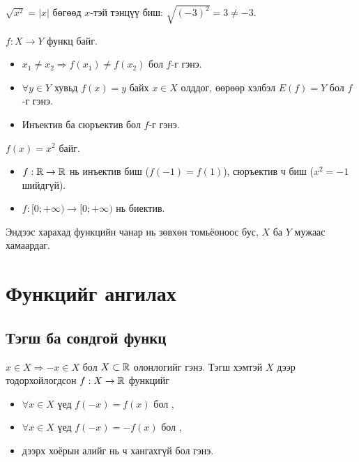 \begin{remark}
$\sqrt{x^2}=|x|$ бөгөөд $x$-тэй тэнцүү биш: $\sqrt{(-3)^2}=3\neq-3$.
\end{remark}

\begin{definition}
$f:X\to Y$ функц байг.
\begin{itemize}
  \item $x_1\neq x_2 \Rightarrow f(x_1)\neq f(x_2)$ бол $f$-г  гэнэ.
  \item $\forall y\in Y$ хувьд $f(x)=y$ байх $x\in X$ олддог, өөрөөр хэлбэл $E(f)=Y$ бол
        $f$-г  гэнэ.
  \item Инъектив ба сюръектив бол $f$-г  гэнэ.
\end{itemize}
\end{definition}

\begin{example}
$f(x)=x^2$ байг.
\begin{itemize}
  \item $f:\mathbb{R}\to\mathbb{R}$ нь инъектив биш ($f(-1)=f(1)$), сюръектив ч биш ($x^2=-1$ шийдгүй).
  \item $f:[0;+\infty)\to[0;+\infty)$ нь биектив.
\end{itemize}
Эндээс харахад функцийн чанар нь зөвхөн томьёоноос бус, $X$ ба $Y$ мужаас хамаардаг.
\end{example}

\section{Функцийг ангилах}

\subsection{Тэгш ба сондгой функц}
\begin{definition}
$x\in X \Rightarrow -x\in X$ бол $X\subset\mathbb{R}$ олонлогийг  гэнэ.
Тэгш хэмтэй $X$ дээр тодорхойлогдсон $f:X\to\mathbb{R}$ функцийг
\begin{itemize}
  \item $\forall x\in X$ үед $f(-x)=f(x)$ бол ,
  \item $\forall x\in X$ үед $f(-x)=-f(x)$ бол ,
  \item дээрх хоёрын алийг нь ч хангахгүй бол  гэнэ.
\end{itemize}
\end{definition}

